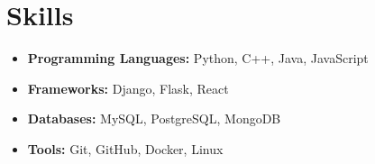 \section*{Skills}

\begin{itemize}
    \item \textbf{Programming Languages:} Python, C++, Java, JavaScript
    \item \textbf{Frameworks:} Django, Flask, React
    \item \textbf{Databases:} MySQL, PostgreSQL, MongoDB
    \item \textbf{Tools:} Git, GitHub, Docker, Linux
\end{itemize}
